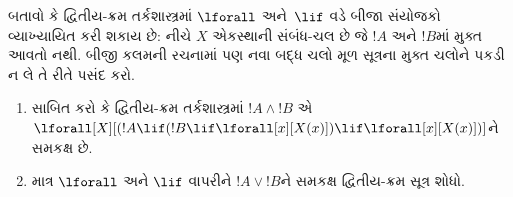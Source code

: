 \documentclass[../../../include/open-logic-section]{subfiles}
\begin{document}
\begin{prob}
  બતાવો કે દ્વિતીય-ક્રમ તર્કશાસ્ત્રમાં $\lforall$ અને~$\lif$ વડે
  બીજા સંયોજકો વ્યાખ્યાયિત કરી શકાય છે:
  નીચે $X$ એકસ્થાની સંબંધ-ચલ છે જે $!A$ અને $!B$માં મુક્ત
  આવતો નથી. બીજી કલમની રચનામાં પણ નવા બદ્ધ ચલો મૂળ સૂત્રના
  મુક્ત ચલોને પકડી ન લે તે રીતે પસંદ કરો.
  \begin{enumerate}
    \item સાબિત કરો કે દ્વિતીય-ક્રમ તર્કશાસ્ત્રમાં $!A \land !B$ એ
    $\lforall[X][(!A \lif (!B \lif \lforall[x][X(x)])\lif
    \lforall[x][X(x)])]$ને સમકક્ષ છે.
    \item માત્ર $\lforall$ અને $\lif$ વાપરીને $!A \lor !B$ને
    સમકક્ષ દ્વિતીય-ક્રમ સૂત્ર શોધો.
  \end{enumerate}
\end{prob}
\end{document}
